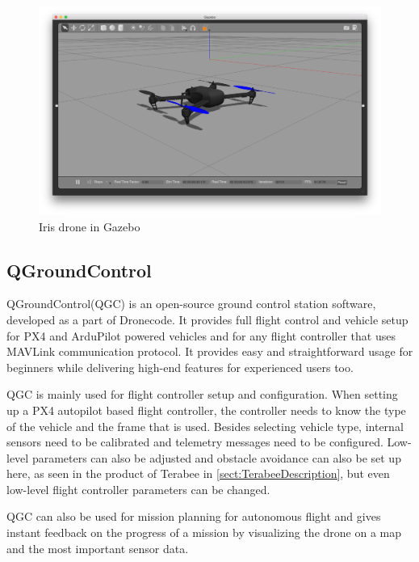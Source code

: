 \begin{figure}[h]
    \centering
    \includegraphics[width=140mm]{figures/iris_gazebo.png}
    \caption{Iris drone in Gazebo}
    \label{fig:px4_sitl_iris}
\end{figure}

\subsection{QGroundControl}
QGroundControl(QGC) is an open-source ground control station software, developed as a part of Dronecode. It provides
full flight control and vehicle setup for PX4 and ArduPilot powered vehicles and for any flight controller that
uses MAVLink communication protocol. It provides easy and straightforward usage for beginners while delivering
high-end features for experienced users too.

QGC is mainly used for flight controller setup and configuration. When setting up a PX4 autopilot based flight 
controller, the controller needs to know the type of the vehicle and the frame that is used. Besides selecting 
vehicle type, internal sensors need to be calibrated and telemetry messages need to be configured. Low-level 
parameters can also be adjusted and obstacle avoidance can also be set up here, as seen in the product of Terabee
in \ref{sect:TerabeeDescription}, but even low-level flight controller parameters can be changed.

QGC can also be used for mission planning for autonomous flight and gives instant feedback on the progress of a 
mission by visualizing the drone on a map and the most important sensor data.


